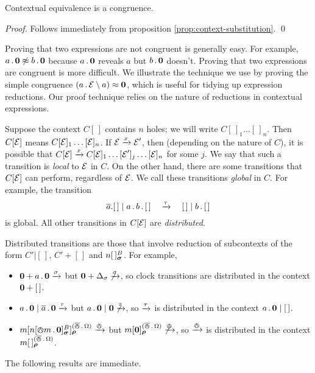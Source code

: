\documentclass[orivec,envcountsame]{llncs}
\newcommand{\Eq}{\approx}
\newcommand{\NotEq}{\not\approx}
\newcommand{\Does}[1]{\xderives{#1}}
\begin{document}
\begin{theorem}
Contextual equivalence is a congruence.
\end{theorem}
\begin{proof}
Follows immediately from proposition \ref{prop:context-substitution}.
\qed \end{proof}


Proving that two expressions are not congruent is generally easy. For
example, $a\pref\nil \NotEq b\pref\nil$ because $a\,.\,\textbf{0}$ reveals $a$
but $b\,.\,\textbf{0}$ doesn't. Proving that two expressions are congruent is
more difficult. We illustrate the technique we use by proving the simple
congruence $\left(a\pref\expr \res{a}\right) \Eq \nil$, which is useful
for tidying up expression reductions. Our proof technique relies on the
nature of reductions in contextual expressions.

Suppose the context $C[\,]$ contains $n$ holes; we will write
$C[\,]_1\dots[\,]_n$. Then $C[\text{$\mathcal{E}$}]$ means $C[\text{$\mathcal{E}$}]_1\dots[\text{$\mathcal{E}$}]_n$. If
$\expr \Does{x} \expr'$, then (depending on the nature of $C$), it is possible
that $C[\expr] \Does{x} C[\expr]_1\dots[\expr']_j\dots[\expr]_n$ for some $j$.
We say that such a transition is \emph{local} to $\text{$\mathcal{E}$}$ in $C$. On the other
hand, there are some transitions that $C[\text{$\mathcal{E}$}]$ can perform, regardless of
$\text{$\mathcal{E}$}$. We call these transitions \emph{global} in $C$. For example, the
transition \[ \out{a}.[\,] \mid a \pref b \pref [\,] \quad\Does{\tau}\quad [\,]
\mid b \pref [\,] \] is global. All other transitions in $C[\text{$\mathcal{E}$}]$ are
\emph{distributed}.

Distributed transitions are those that involve reduction of subcontexts
of the form $C'|[\,]$, $C' + [\,]$ and
$\locv{n}{\,}{B}{\vec{\sigma}}$. For example,
\begin{itemize}
\item
    $\nil + a\pref\nil \Does{\sigma}$ but $\nil + \Delta_\sigma
     \not\Does{\sigma}$, so clock transitions are distributed in the
     context $\textbf{0} + [\,]$.
\item
    $a\pref\nil \mid \out{a}\pref\nil \Does{\tau}$ but $a\pref\nil \mid
     \nil \not\Does{\tau}$, so $\Does{\tau}$ is distributed in the
     context $a\,.\,\textbf{0} \mid [\,]$.
\item
    $\locv{m}{ \locv{n}{\tntout{m}\pref\nil}{B}{\vec{\sigma}}}%
     {(\bout\pref\Omega)}{\vec{\rho}} \Does{\tout}$ but
    $\locv{m}{ \nil }{(\bout\pref\Omega)}{\vec{\rho}} \not\Does{\tout}$,
     so $\Does{\tout}$ is distributed in the context $\locv{m}{\,}%
     {(\bout\pref\Omega)}{\vec{\rho}}$.
\end{itemize}
The following results are immediate.
\end{document}
